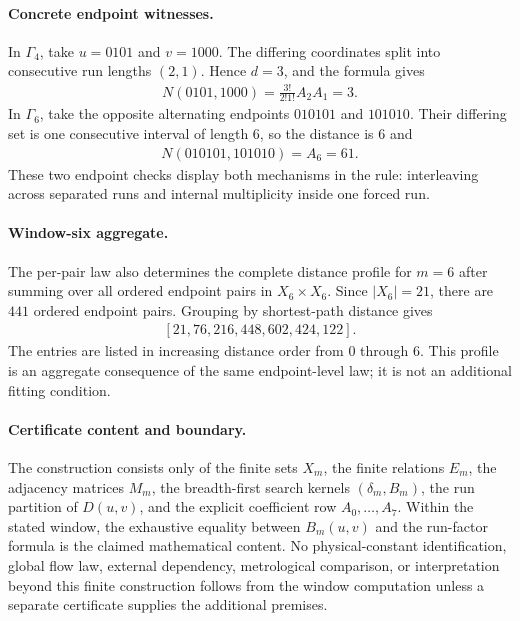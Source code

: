 \paragraph{Concrete endpoint witnesses.}
In $\Gamma_4$, take $u=0101$ and $v=1000$. The differing coordinates split into consecutive run lengths $(2,1)$. Hence $d=3$, and the formula gives
$$
\begin{aligned}
N(0101,1000)=\frac{3!}{2!1!}A_2A_1=3.
\end{aligned}
$$
In $\Gamma_6$, take the opposite alternating endpoints $010101$ and $101010$. Their differing set is one consecutive interval of length $6$, so the distance is $6$ and
$$
\begin{aligned}
N(010101,101010)=A_6=61.
\end{aligned}
$$
These two endpoint checks display both mechanisms in the rule: interleaving across separated runs and internal multiplicity inside one forced run.

\paragraph{Window-six aggregate.}
The per-pair law also determines the complete distance profile for $m=6$ after summing over all ordered endpoint pairs in $X_6\times X_6$. Since $|X_6|=21$, there are $441$ ordered endpoint pairs. Grouping by shortest-path distance gives
$$
\begin{aligned}
[21,76,216,448,602,424,122].
\end{aligned}
$$
The entries are listed in increasing distance order from $0$ through $6$. This profile is an aggregate consequence of the same endpoint-level law; it is not an additional fitting condition.

\paragraph{Certificate content and boundary.}
The construction consists only of the finite sets $X_m$, the finite relations $E_m$, the adjacency matrices $M_m$, the breadth-first search kernels $(\delta_m,B_m)$, the run partition of $D(u,v)$, and the explicit coefficient row $A_0,\ldots,A_7$. Within the stated window, the exhaustive equality between $B_m(u,v)$ and the run-factor formula is the claimed mathematical content. No physical-constant identification, global flow law, external dependency, metrological comparison, or interpretation beyond this finite construction follows from the window computation unless a separate certificate supplies the additional premises.
